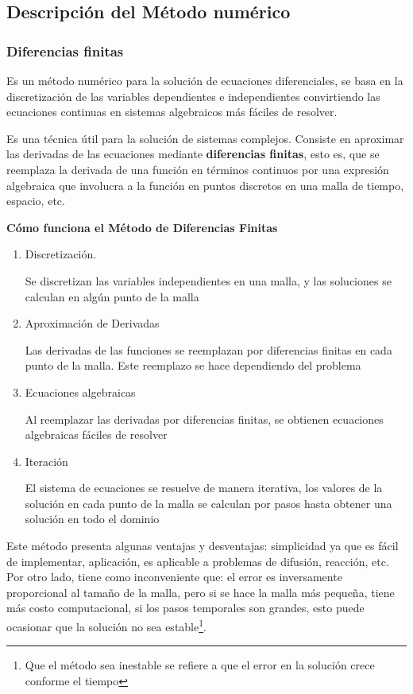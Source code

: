 \subsection{Descripción del Método numérico}
\subsubsection{Diferencias finitas}

Es un método numérico para la solución de ecuaciones diferenciales, se basa en la discretización de las variables dependientes e independientes convirtiendo las ecuaciones continuas en sistemas algebraicos más fáciles de resolver.

Es una técnica útil para la solución de sistemas complejos. Consiste en aproximar las derivadas de las ecuaciones mediante \textbf{diferencias finitas}, esto es, que se reemplaza la derivada de una función en términos continuos por una expresión algebraica que involucra a la función en puntos discretos en una malla de tiempo, espacio, etc.

\textbf{{Cómo funciona el Método de Diferencias Finitas}}
\begin{enumerate}
	\item Discretización.

	      Se discretizan las variables independientes en una malla, y las soluciones se calculan en algún punto de la malla

	\item Aproximación de Derivadas

	      Las derivadas de las funciones se reemplazan por diferencias finitas en cada punto de la malla. Este reemplazo se hace dependiendo del problema

	\item Ecuaciones algebraicas

	      Al reemplazar las derivadas por diferencias finitas, se obtienen ecuaciones algebraicas fáciles de resolver

	\item Iteración

	      El sistema de ecuaciones se resuelve de manera iterativa, los valores de la solución en cada punto de la malla se calculan por pasos hasta obtener una solución en todo el dominio
\end{enumerate}

Este método presenta algunas ventajas y desventajas: simplicidad ya que es fácil de implementar, aplicación, es aplicable a problemas de difusión, reacción, etc. Por otro lado, tiene como inconveniente que: el error es inversamente proporcional al tamaño de la malla, pero si se hace la malla más pequeña, tiene más costo computacional, si los pasos temporales son grandes, esto puede ocasionar que la solución no sea estable\footnote{Que el método sea inestable se refiere a que el error en la solución crece conforme el tiempo}\citep{ledesma2015introduccion}.

